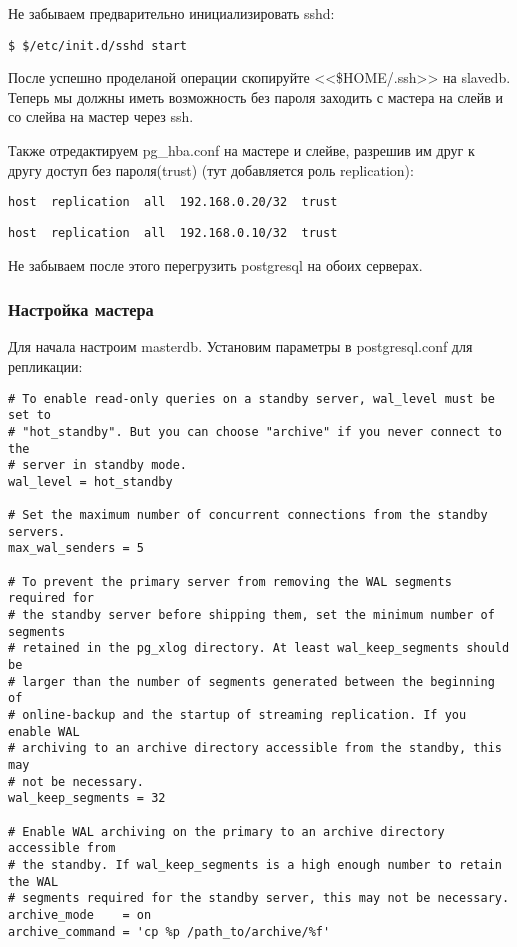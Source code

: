 Не забываем предварительно инициализировать sshd:
\begin{lstlisting}[label=lst:streaming6,caption=Запуск sshd]
$ $/etc/init.d/sshd start
\end{lstlisting}

После успешно проделаной операции скопируйте <<\$HOME/.ssh>> на slavedb.
Теперь мы должны иметь возможность без пароля заходить с мастера на слейв и со слейва на мастер через ssh.

Также отредактируем pg\_hba.conf на мастере и слейве, разрешив им друг к другу доступ без пароля(trust) (тут добавляется роль replication):
\begin{lstlisting}[label=lst:streaming7,caption=Мастер pg\_hba.conf]
host  replication  all  192.168.0.20/32  trust
\end{lstlisting}
\begin{lstlisting}[label=lst:streaming8,caption=Слейв pg\_hba.conf]
host  replication  all  192.168.0.10/32  trust
\end{lstlisting}

Не забываем после этого перегрузить postgresql на обоих серверах.

\subsubsection{Настройка мастера}
Для начала настроим masterdb. Установим параметры в postgresql.conf для репликации:
\begin{lstlisting}[label=lst:streaming9,caption=Настройка мастера]
# To enable read-only queries on a standby server, wal_level must be set to
# "hot_standby". But you can choose "archive" if you never connect to the
# server in standby mode.
wal_level = hot_standby

# Set the maximum number of concurrent connections from the standby servers.
max_wal_senders = 5

# To prevent the primary server from removing the WAL segments required for
# the standby server before shipping them, set the minimum number of segments
# retained in the pg_xlog directory. At least wal_keep_segments should be
# larger than the number of segments generated between the beginning of
# online-backup and the startup of streaming replication. If you enable WAL
# archiving to an archive directory accessible from the standby, this may
# not be necessary.
wal_keep_segments = 32

# Enable WAL archiving on the primary to an archive directory accessible from
# the standby. If wal_keep_segments is a high enough number to retain the WAL
# segments required for the standby server, this may not be necessary.
archive_mode    = on
archive_command = 'cp %p /path_to/archive/%f'
\end{lstlisting}

